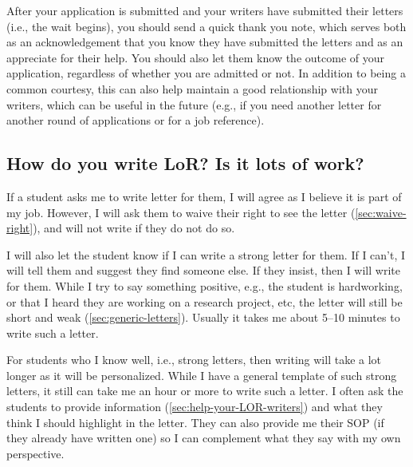 \documentclass[oneside,11pt,dvipsnames]{book}
\newenvironment{commentbox}[1][]{
  \small
  \begin{mybox}
    {\small \textbf{#1}}
  }{
  \end{mybox}
}
\begin{document}
After your application is submitted and your writers have submitted their letters (i.e., the wait begins), you should send a quick thank you note, which serves both as an acknowledgement that you know they have submitted the letters and as an appreciate for their help.  You should also let them know the outcome of your application, regardless of whether you are admitted or not.  In addition to being a common courtesy, this can also help maintain a good relationship with your writers, which can be useful in the future (e.g., if you need another letter for another round of applications or for a job reference).




\subsection{How do you write LoR? Is it lots of work?}\label{sec:lor-writing}

If a student asks me to write letter for them, I will agree as I believe it is part of my job. However, I will ask them to waive their right to see the letter (\autoref{sec:waive-right}), and will not write if they do not do so.

I will also let the student know if I can write a strong letter for them.  If I can't, I will tell them and suggest they find someone else.  If they insist, then I will write for them. While I try to say something positive, e.g., the student is hardworking, or that I heard they are working on a research project, etc, the letter will still be short and weak (\autoref{sec:generic-letters}). Usually it takes me about 5--10 minutes to write such a letter.

For students who I know well, i.e., strong letters, then writing will take a lot longer as it will be personalized.  While I have a general template of such strong letters, it still can take me an hour or more to write such a letter.  I often ask the students to provide information (\autoref{sec:help-your-LOR-writers}) and what they think I should highlight in the letter. They can also provide me their SOP (if they already have written one) so I can complement what they say with my own perspective.
\end{document}
